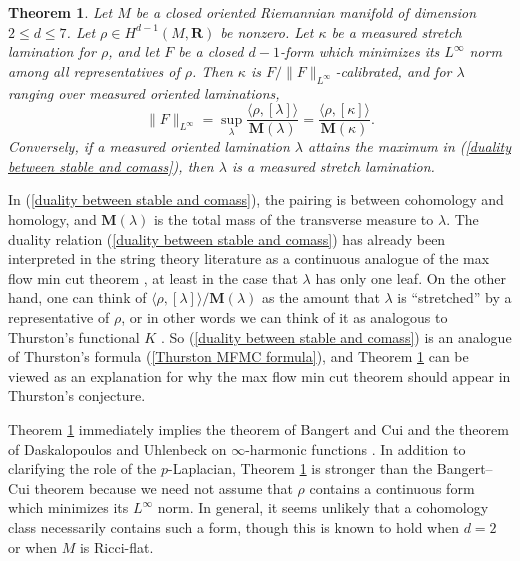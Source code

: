 \documentclass[reqno,11pt]{amsart}
\newcommand{\RR}{\mathbf{R}}
\newcommand{\Mass}{\mathbf M}
\newtheorem{theorem}{Theorem}[section]
\theoremstyle{definition}
\numberwithin{equation}{section}
\begin{document}
\begin{theorem}\label{lams are calibrated}
Let $M$ be a closed oriented Riemannian manifold of dimension $2 \leq d \leq 7$.
Let $\rho \in H^{d - 1}(M, \RR)$ be nonzero.
Let $\kappa$ be a measured stretch lamination for $\rho$, and let $F$ be a closed $d - 1$-form which minimizes its $L^\infty$ norm among all representatives of $\rho$.
Then $\kappa$ is $F/\|F\|_{L^\infty}$-calibrated, and for $\lambda$ ranging over measured oriented laminations,
\begin{equation}\label{duality between stable and comass}
\|F\|_{L^\infty} = \sup_\lambda \frac{\langle \rho, [\lambda]\rangle}{\Mass(\lambda)} = \frac{\langle \rho, [\kappa]\rangle}{\Mass(\kappa)}.
\end{equation}
Conversely, if a measured oriented lamination $\lambda$ attains the maximum in (\ref{duality between stable and comass}), then $\lambda$ is a measured stretch lamination.
\end{theorem}

In (\ref{duality between stable and comass}), the pairing is between cohomology and homology, and $\Mass(\lambda)$ is the total mass of the transverse measure to $\lambda$.
The duality relation (\ref{duality between stable and comass}) has already been interpreted in the string theory literature as a continuous analogue of the max flow min cut theorem \cite{Freedman_2016}, at least in the case that $\lambda$ has only one leaf.
On the other hand, one can think of $\langle \rho, [\lambda]\rangle/\Mass(\lambda)$ as the amount that $\lambda$ is ``stretched'' by a representative of $\rho$, or in other words we can think of it as analogous to Thurston's functional $K$ \cite[\S5.3]{daskalopoulos2020transverse}.
So (\ref{duality between stable and comass}) is an analogue of Thurston's formula (\ref{Thurston MFMC formula}), and Theorem \ref{lams are calibrated} can be viewed as an explanation for why the max flow min cut theorem should appear in Thurston's conjecture.

Theorem \ref{lams are calibrated} immediately implies the theorem of Bangert and Cui \cite{bangert_cui_2017} and the theorem of Daskalopoulos and Uhlenbeck on $\infty$-harmonic functions \cite{daskalopoulos2020transverse}.
In addition to clarifying the role of the $p$-Laplacian, Theorem \ref{lams are calibrated} is stronger than the Bangert--Cui theorem because we need not assume that $\rho$ contains a continuous form which minimizes its $L^\infty$ norm.
In general, it seems unlikely that a cohomology class necessarily contains such a form, though this is known to hold when $d = 2$ \cite{Evans08} or when $M$ is Ricci-flat. 
\end{document}
